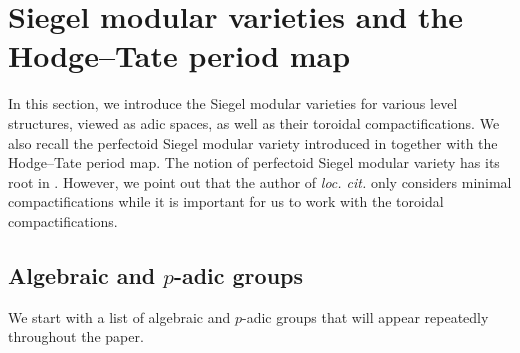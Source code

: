 \section{Siegel modular varieties and the Hodge--Tate period map}\label{section:PerfectoidSMV}
In this section, we introduce the Siegel modular varieties for various level structures, viewed as adic spaces, as well as their toroidal compactifications. We also recall the perfectoid Siegel modular variety introduced in \cite{Pilloni-Stroh-CoherentCohomologyandGaloisRepresentations} together with the Hodge--Tate period map. The notion of perfectoid Siegel modular variety has its root in \cite{Scholze-2015}. However, we point out that the author of \textit{loc. cit.} only considers minimal compactifications while it is important for us to work with the toroidal compactifications.

\subsection{\texorpdfstring{Algebraic and $p$-adic groups}{Algebraic and p-adic groups}}\label{subsection: Algebraic and p-adic groups}
We start with a list of algebraic and $p$-adic groups that will appear repeatedly throughout the paper. 

